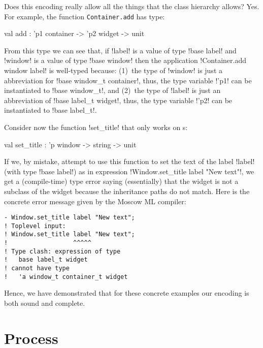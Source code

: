 \documentclass[finalversion]{usetex-v1}
\begin{document}
Does this encoding really allow all the things that the \gtk class
hierarchy allows?  Yes. For example, the function
\texttt{Container.add} has type:
\begin{SMLcode}
val add : 'p1 container -> 'p2 widget 
                                 -> unit
\end{SMLcode}
From this type we can see that, if !label! is a value of type 
%
!base label! 
% 
and !window! is a value of type !base window! then
the application
%
!Container.add window label!
%
is well-typed because: (1)~the type of !window! is just a abbreviation for 
%
!base window_t container!,
%
thus, the type variable !'p1! can be instantiated to 
%
!base window_t!,
% 
and (2)~the type of !label! is just an abbreviation of 
%
!base label_t widget!,
%
thus, the type variable !'p2! can be instantiated to 
%
!base label_t!.

Consider now the function !set_title! that only works on s:
\begin{SMLcode}
val set_title : 'p window -> string -> unit
\end{SMLcode}
If we, by mistake, attempt to use this function to set the text of the
label !label! (with type !base label!) as in expression
%
!Window.set_title label "New text"!, 
%
we get a (compile-time) type error saying (essentially) that the
 widget is not a subclass of the 
widget because the inheritance paths do not match.  Here is the
concrete error message given by the Moscow ML compiler:
\begin{verbatim}
- Window.set_title label "New text";
! Toplevel input:
! Window.set_title label "New text";
!                  ^^^^^
! Type clash: expression of type
!   base label_t widget
! cannot have type
!   'a window_t container_t widget
\end{verbatim}

Hence, we have demonstrated that for these concrete
examples our encoding is both sound and complete.




\section{Process}
\label{sec:process}
\end{document}
